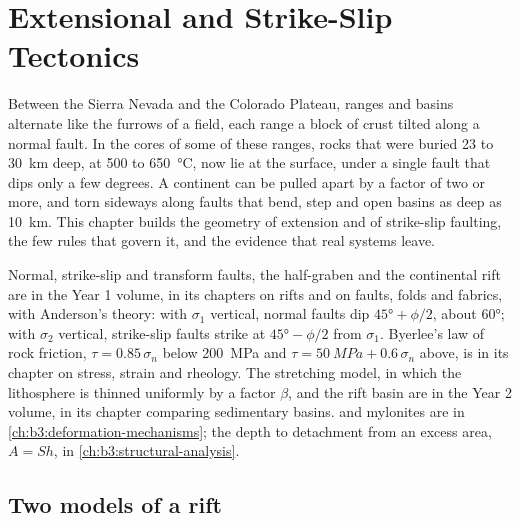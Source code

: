 \chapter{Extensional and Strike-Slip Tectonics}\label{ch:b3:extension-strike-slip}

Between the Sierra Nevada and the Colorado Plateau, ranges and basins
alternate like the furrows of a field, each range a block of crust tilted
along a normal fault. In the cores of some of these ranges, rocks that were
buried 23 to \qty{30}{km} deep, at 500 to \qty{650}{\celsius}, now lie at the
surface, under a single fault that dips only a few degrees. A continent can
be pulled apart by a factor of two or more, and torn sideways along faults
that bend, step and open basins as deep as \qty{10}{km}. This chapter builds
the geometry of extension and of strike-slip faulting, the few rules that
govern it, and the evidence that real systems leave.

\begin{recall}
Normal, strike-slip and transform faults, the half-graben and the continental
rift are in the Year 1 volume, in its chapters on rifts and on faults, folds
and fabrics, with Anderson's theory: with $\sigma_1$ vertical, normal faults
dip $\ang{45} + \phi/2$, about \ang{60}; with $\sigma_2$ vertical, strike-slip
faults strike at $\ang{45} - \phi/2$ from $\sigma_1$. Byerlee's law of rock
friction, $\tau = 0.85\,\sigma_n$ below \qty{200}{MPa} and $\tau =
\qty{50}{MPa} + 0.6\,\sigma_n$ above, is in its chapter on stress, strain and
rheology. The stretching model, in which the lithosphere is thinned uniformly
by a factor $\beta$, and the rift basin are in the Year 2 volume, in its
chapter comparing sedimentary basins.  and mylonites are in
\cref{ch:b3:deformation-mechanisms}; the depth to detachment from an excess
area, $A = Sh$, in \cref{ch:b3:structural-analysis}.
\end{recall}

\section{Two models of a rift}\label{sec:b3:extension-strike-slip:models}

